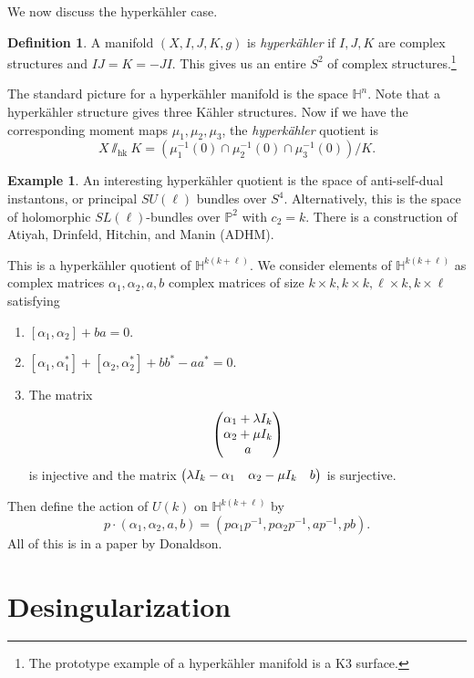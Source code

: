 \documentclass[leqno, openany]{memoir}
\theoremstyle{definition}
\newtheorem{defn}[thm]{Definition}
\newtheorem{exm}[thm]{Example}
\theoremstyle{remark}
\theoremstyle{plain}
\theoremstyle{definition}
\theoremstyle{remark}
\renewcommand{\P}{\mathbb{P}}
\newcommand{\mr}[1]{\mathrm{#1}}
\begin{document}
We now discuss the hyperk\"ahler case.

\begin{defn}
    A manifold $(X, I, J, K, g)$ is \textit{hyperk\"ahler} if $I, J, K$ are complex structures and $IJ = K = -JI$. This gives us an entire $S^2$ of complex structures.\footnote{The prototype example of a hyperk\"ahler manifold is a K3 surface.}
\end{defn}

The standard picture for a hyperk\"ahler manifold is the space $\mathbb{H}^n$. Note that a hyperk\"ahler structure gives three K\"ahler structures. Now if we have the corresponding moment maps $\mu_1, \mu_2, \mu_3$, the \textit{hyperk\"ahler} quotient is 
\[ X \sslash_{\mr{hk}} K = (\mu_1^{-1}(0) \cap \mu_2^{-1}(0) \cap \mu_3^{-1}(0)) / K. \]

\begin{exm}
    An interesting hyperk\"ahler quotient is the space of anti-self-dual instantons, or principal $SU(\ell)$ bundles over $S^4$. Alternatively, this is the space of holomorphic $SL(\ell)$-bundles over $\P^2$ with $c_2 = k$. There is a construction of Atiyah, Drinfeld, Hitchin, and Manin (ADHM). 

    This is a hyperk\"ahler quotient of $\mathbb{H}^{k(k+\ell)}$. We consider elements of $\mathbb{H}^{k(k+\ell)}$ as complex matrices $\alpha_1, \alpha_2, a, b$ complex matrices of size $k \times k, k \times k, \ell \times k, k \times \ell$ satisfying
    \begin{enumerate}
        \item $[\alpha_1, \alpha_2] + ba = 0$.
        \item $[\alpha_1, \alpha_1^*] + [\alpha_2, \alpha_2^*] + bb^* - aa^* = 0$.
        \item The matrix
            \[ \mqty( \alpha_1 + \lambda I_k \\ \alpha_2 + \mu I_k \\ a ) \] is injective and the matrix $\mqty(\lambda I_k - \alpha_1 & \alpha_2 - \mu I_k & b)$ is surjective.
    \end{enumerate}
    Then define the action of $U(k)$ on $\mathbb{H}^{k(k+\ell)}$ by
    \[ p \cdot (\alpha_1, \alpha_2, a, b) = (p \alpha_1 p^{-1}, p \alpha_2 p^{-1}, a p^{-1}, pb). \]
    All of this is in a paper by Donaldson.
\end{exm}

\section{Desingularization}%
\label{sec:desingularization}
\end{document}
